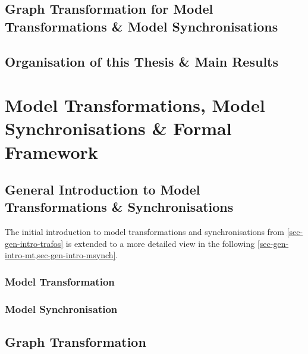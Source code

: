 \documentclass{eceasst}
\begin{document}
\section[Graph Transformations for Model Trans. \& Synchronisations]{Graph Transformation for Model Transformations \& Model Synchronisations}
\label{sec-gen-intro-gratrafo}


\section{Organisation of this Thesis \& Main Results}


\chapter[Model Transformations, Synchronisations \& Framework]{Model Transformations, Model Synchronisations \& Formal Framework}
\label{sec-mt-ms-ff}

\section{General Introduction to Model Transformations \& Synchronisations}
\label{sec-gen-intro-mt-ms}

The initial introduction to model transformations and synchronisations from \cref{sec-gen-intro-trafos} is extended to a more detailed view in the following \cref{sec-gen-intro-mt,sec-gen-intro-msynch}.

\subsection{Model Transformation}
\label{sec-gen-intro-mt}


\subsection{Model Synchronisation}
\label{sec-gen-intro-msynch}


\section{Graph Transformation}
\label{sec-gen-intro-gt}
\end{document}
